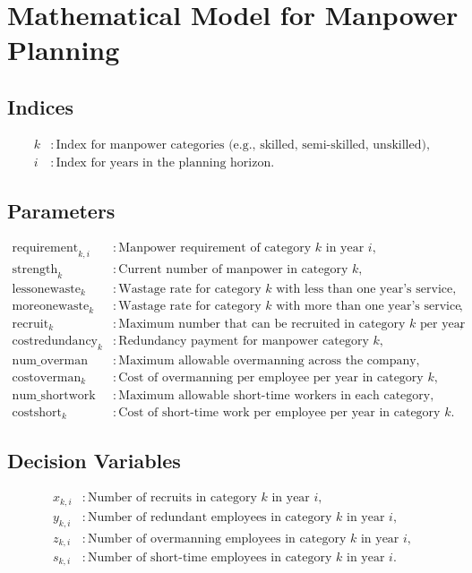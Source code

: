 \documentclass{article}
\begin{document}
\section*{Mathematical Model for Manpower Planning}

\subsection*{Indices}
\begin{align*}
k & : \text{Index for manpower categories (e.g., skilled, semi-skilled, unskilled)}, \\
i & : \text{Index for years in the planning horizon}.
\end{align*}

\subsection*{Parameters}
\begin{align*}
\text{requirement}_{k,i} & : \text{Manpower requirement of category $k$ in year $i$}, \\
\text{strength}_k & : \text{Current number of manpower in category $k$}, \\
\text{lessonewaste}_k & : \text{Wastage rate for category $k$ with less than one year's service}, \\
\text{moreonewaste}_k & : \text{Wastage rate for category $k$ with more than one year's service}, \\
\text{recruit}_k & : \text{Maximum number that can be recruited in category $k$ per year}, \\
\text{costredundancy}_k & : \text{Redundancy payment for manpower category $k$}, \\
\text{num\_overman} & : \text{Maximum allowable overmanning across the company}, \\
\text{costoverman}_k & : \text{Cost of overmanning per employee per year in category $k$}, \\
\text{num\_shortwork} & : \text{Maximum allowable short-time workers in each category}, \\
\text{costshort}_k & : \text{Cost of short-time work per employee per year in category $k$}.
\end{align*}

\subsection*{Decision Variables}
\begin{align*}
x_{k,i} & : \text{Number of recruits in category $k$ in year $i$}, \\
y_{k,i} & : \text{Number of redundant employees in category $k$ in year $i$}, \\
z_{k,i} & : \text{Number of overmanning employees in category $k$ in year $i$}, \\
s_{k,i} & : \text{Number of short-time employees in category $k$ in year $i$}.
\end{align*}
\end{document}
